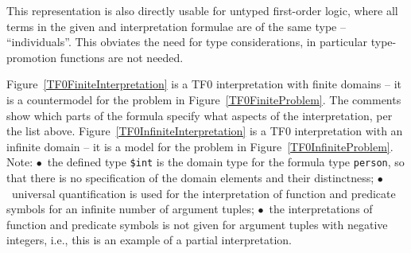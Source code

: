 \documentclass[letterpaper]{article}
\newcommand{\smalltt}[1]{\small \texttt{#1}}
\begin{document}
This representation is also directly usable for untyped first-order logic, where all terms in 
the given and interpretation formulae are of the same type – ``individuals''. 
This obviates the need for type considerations, in particular type-promotion functions are not 
needed.

Figure~\ref{TF0FiniteInterpretation} is a TF0 interpretation with finite domains -- it is a 
countermodel for the problem in Figure~\ref{TF0FiniteProblem}.
The comments show which parts of the formula specify what aspects of the interpretation, per
the list above.
Figure~\ref{TF0InfiniteInterpretation} is a TF0 interpretation with an infinite domain -- it 
is a model for the problem in Figure~\ref{TF0InfiniteProblem}.
Note:
$\bullet$~the defined type {\smalltt{\$int}} is the domain type for the formula type 
{\smalltt{person}}, so that there is no specification of the domain elements and their 
distinctness;
$\bullet$~universal quantification is used for the interpretation of function and predicate
symbols for an infinite number of argument tuples;
$\bullet$~the interpretations of function and predicate symbols is not given for argument 
tuples with negative integers, i.e., this is an example of a partial interpretation.
\end{document}
